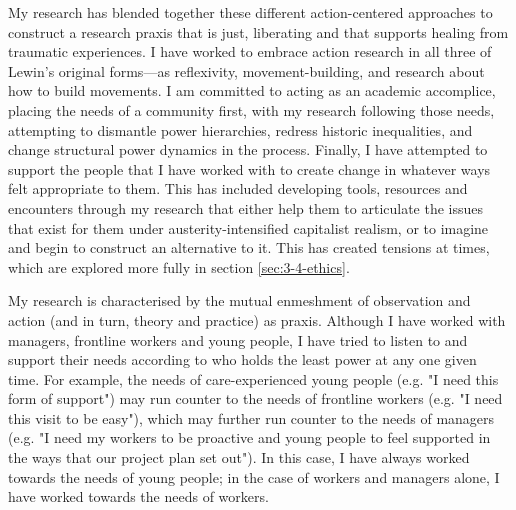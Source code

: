 My research has blended together these different action-centered approaches to construct a research praxis that is just, liberating and that supports healing from traumatic experiences. I have worked to embrace action research in all three of Lewin's original forms—as reflexivity, movement-building, and research about how to build movements. I am committed to acting as an academic accomplice, placing the needs of a community first, with my research following those needs, attempting to dismantle power hierarchies, redress historic inequalities, and change structural power dynamics in the process. Finally, I have attempted to support the people that I have worked with to create change in whatever ways felt appropriate to them. This has included developing tools, resources and encounters through my research that either help them to articulate the issues that exist for them under austerity-intensified capitalist realism, or to imagine and begin to construct an alternative to it. This has created tensions at times, which are explored more fully in section \ref{sec:3-4-ethics}. 

My research is characterised by the mutual enmeshment of observation and action (and in turn, theory and practice) as praxis. Although I have worked with managers, frontline workers and young people, I have tried to listen to and support their needs according to who holds the least power at any one given time. For example, the needs of care-experienced young people (e.g. "I need this form of support") may run counter to the needs of frontline workers (e.g. "I need this visit to be easy"), which may further run counter to the needs of managers (e.g. "I need my workers to be proactive and young people to feel supported in the ways that our project plan set out"). In this case, I have always worked towards the needs of young people; in the case of workers and managers alone, I have worked towards the needs of workers. 

